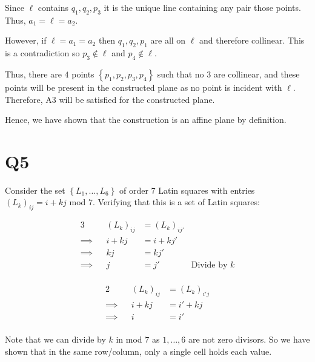 \documentclass[a4paper, 11pt]{article}
\def\set#1{\left\{ #1 \right\}}
\begin{document}
\begin{itemize}
\begin{mdframed}
			Since $\ell$ contains $q_1,q_2,p_3$ it is the unique line containing any pair those points. Thus, $a_1=\ell=a_2$. 

			However, if $\ell=a_1=a_2$ then $q_1,q_2,p_1$ are all on $\ell$ and therefore collinear. This is a contradiction so $p_3\notin\ell$ and $p_4\notin\ell$. 
		\end{mdframed}

		Thus, there are $4$ points $\set{p_1,p_2,p_3,p_4}$ such that no $3$ are collinear, and these points will be present in the constructed plane as no point is incident with $\ell$. Therefore, A3 will be satisfied for the constructed plane. 
\end{itemize}

Hence, we have shown that the construction is an affine plane by definition.

\pagebreak
\section*{Q5}
Consider the set $\set{L_1,\dots,L_6}$ of order $7$ Latin squares with entries $(L_k)_{ij}= i+kj$ mod $7$. Verifying that this is a set of Latin squares: 

\begin{mdframed}
	\begin{minipage}{0.5\textwidth}
		\begin{alignat*}{3}
			&& (L_k)_{ij} &= (L_k)_{ij'}	\\
	\implies&&i+kj        &= i+kj'          \\
	\implies&&kj          &= kj'            \\
	\implies&& j          &= j' &\text{Divide by $k$}            \\
	\end{alignat*}
	\end{minipage}
	\begin{minipage}{0.5\textwidth}
		\begin{alignat*}{2}
			&& (L_k)_{ij} &= (L_k)_{i'j}	\\
		\implies&&i+kj    &= i'+kj          \\
		\implies&&i       &= i'            \\
		\end{alignat*}
	\end{minipage}
	
	Note that we can divide by $k$ in mod $7$ as $1,\dots,6$ are not zero divisors. So we have shown that in the same row/column, only a single cell holds each value.
\end{mdframed}
\end{document}

